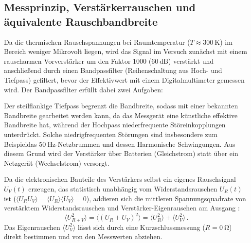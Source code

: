 \documentclass[12pt,a4paper,titlepage]{scrartcl}
\numberwithin{equation}{section}
\numberwithin{table}{section}
\numberwithin{figure}{section}
\begin{document}
\subsection{Messprinzip, Verstärkerrauschen und äquivalente Rauschbandbreite}
Da die thermischen Rauschspannungen bei Raumtemperatur ($T \approx \SI{300}{\kelvin}$) im Bereich weniger Mikrovolt liegen, wird das Signal im Versuch zunächst mit einem rauscharmen Vorverstärker um den Faktor $\num{1000}$ ($\SI{60}{\deci\bel}$) verstärkt und anschließend durch einen Bandpassfilter (Reihenschaltung aus Hoch- und Tiefpass) gefiltert, bevor der Effektivwert mit einem Digitalmultimeter gemessen wird. Der Bandpassfilter erfüllt dabei zwei Aufgaben:

Der steilflankige Tiefpass begrenzt die Bandbreite, sodass mit einer bekannten Bandbreite gearbeitet werden kann, da das Messgerät eine künstliche effektive Bandbreite hat, während der Hochpass niederfrequente Störeinkopplungen unterdrückt. Solche niedrigfrequenten Störungen sind insbesondere zum Beispieldas $\SI{50}{\hertz}$-Netzbrummen und dessen Harmonische Schwingungen. Aus diesem Grund wird der Verstärker über Batterien (Gleichstrom) statt über ein Netzgerät (Wechselstrom) versorgt.

Da die elektronischen Bauteile des Verstärkers selbst ein eigenes Rauschsignal $U_V(t)$ erzeugen, das statistisch unabhängig vom Widerstandsrauschen $U_R(t)$ ist ($\langle U_R U_V \rangle = \langle U_R \rangle \langle U_V \rangle = 0$), addieren sich die mittleren Spannungsquadrate von verstärktem Widerstandsrauschen und Verstärker-Eigenrauschen am Ausgang \cite{PAPskript}:
\begin{equation}
    \langle U_{R+V}^2 \rangle = \langle (U_R + U_V)^2 \rangle = \langle U_R^2 \rangle + \langle U_V^2 \rangle \,.
    \label{eq:additivitaet}
\end{equation}
Das Eigenrauschen $\langle U_V^2 \rangle$ lässt sich durch eine Kurzschlussmessung ($R = \SI{0}{\ohm}$) direkt bestimmen und von den Messwerten abziehen.
\end{document}
